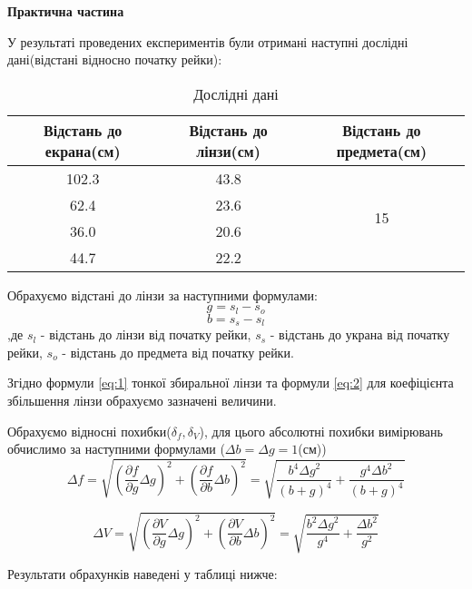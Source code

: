 \begin{center}
    \Large{\textbf{Практична частина}}
\end{center}

\vspace{1mm}

У результаті проведених експериментів 
були отримані наступні дослідні дані(відстані відносно початку рейки):
\begin{table}[h] \label{table:raw}
    \centering
    \begin{tabular}{ |c|c|c| }
        \hline 
        \textbf{Відстань до екрана(см)} & \textbf{Відстань до лінзи(см)} & \textbf{Відстань до предмета(см)} \\
        \hline
        102.3 & 43.8 & \multirow{4}{*}{15} \\
        \cline{1-2}
        62.4 & 23.6 & \\
        \cline{1-2}
        36.0 & 20.6 & \\
        \cline{1-2}
        44.7 & 22.2 & \\
        \hline
    \end{tabular}
    \caption{Дослідні дані}
\end{table}


Обрахуємо відстані до лінзи за наступними формулами:
$$ g = s_l - s_o $$
$$ b = s_s - s_l $$
,де $s_l$ - відстань до лінзи від початку рейки,
$s_s$ - відстань до украна від початку рейки,
$s_o$ - відстань до предмета від початку рейки.

Згідно формули \ref{eq:1} тонкої збиральної лінзи 
та формули \ref{eq:2} для коефіцієнта збільшення лінзи обрахуємо
зазначені величини. 

Обрахуємо відносні похибки($\delta_f, \delta_V$), для цього абсолютні похибки вимірювань обчислимо за наступними формулами ($\Delta b = \Delta g = 1$(см))
$$ \Delta f = \sqrt{ \left( \frac{\partial{f}}{ \partial{g} } \Delta g \right)^2 +
\left( \frac{\partial{f}}{ \partial{b} } \Delta b \right)^2 } = 
\sqrt{ \frac{b^4 {\Delta g}^2}{ (b+g)^4 } + \frac{g^4 {\Delta b}^2}{ (b+g)^4 } } $$

$$ \Delta V = \sqrt{ \left( \frac{\partial{V}}{ \partial{g} } \Delta g \right)^2 +
\left( \frac{\partial{V}}{ \partial{b} } \Delta b \right)^2 } =
\sqrt{ \frac{b^2 {\Delta g}^2}{ g^4 } + \frac{{\Delta b}^2}{ g^2 } } $$

Результати обрахунків наведені у таблиці нижче:

